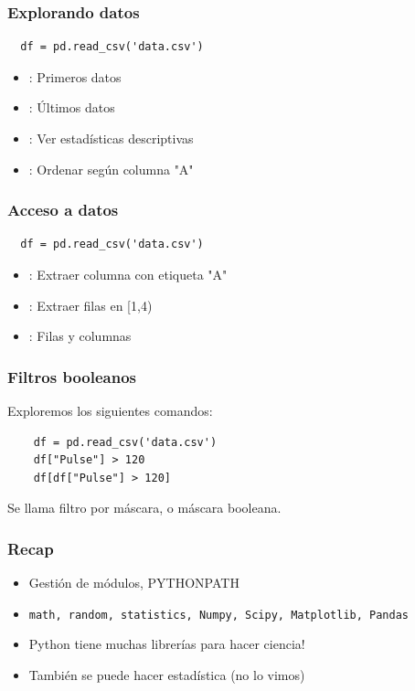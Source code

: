 \documentclass[14pt,aspectratio=169,xcolor=dvipsnames]{beamer}
\begin{document}
\begin{frame}[fragile]\frametitle{Explorando datos}
    \begin{verbatim}
  df = pd.read_csv('data.csv')
    \end{verbatim}
    \begin{itemize}
        \item {}: Primeros  datos
        \item {}: Últimos  datos
        \item {}: Ver estadísticas descriptivas
        \item {}: Ordenar según columna "A"
    \end{itemize}
    
\end{frame}
\begin{frame}[fragile]\frametitle{Acceso a datos}
    \begin{verbatim}
  df = pd.read_csv('data.csv')
    \end{verbatim}
    \begin{itemize}
        \item {}: Extraer columna con etiqueta "A"
        \item {}: Extraer filas en [1,4)
        \item {}: Filas y columnas
    \end{itemize}

\end{frame}
\begin{frame}[fragile]\frametitle{Filtros booleanos}

    Exploremos los siguientes comandos: 
    \begin{verbatim}
    df = pd.read_csv('data.csv')
    df["Pulse"] > 120
    df[df["Pulse"] > 120]
    \end{verbatim}

    \vspace{1cm}
    \pause Se llama filtro por máscara, o máscara booleana.
\end{frame}
\begin{frame}\frametitle{Recap}
    \begin{itemize}
        \item Gestión de módulos, PYTHONPATH
        \item \texttt{math, random, statistics, Numpy, Scipy, Matplotlib, Pandas}
        \item Python tiene muchas librerías para hacer ciencia!
        \item También se puede hacer estadística (no lo vimos)
    \end{itemize}

    \pause
    \vspace{1cm}
\end{frame}
\end{document}
